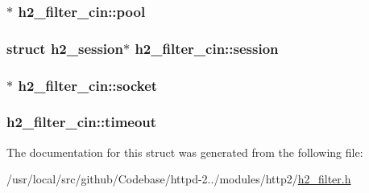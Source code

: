 \subsubsection[{\texorpdfstring{pool}{pool}}]{$\ast$ h2\+\_\+filter\+\_\+cin\+::pool}\hypertarget{structh2__filter__cin_a63b8f38ac651f0c071952a044ddca0fc}{}\label{structh2__filter__cin_a63b8f38ac651f0c071952a044ddca0fc}
\subsubsection[{\texorpdfstring{session}{session}}]{\setlength{\rightskip}{0pt plus 5cm}struct {\bf h2\+\_\+session}$\ast$ h2\+\_\+filter\+\_\+cin\+::session}\hypertarget{structh2__filter__cin_a2494031f9e3a6e0285892d2c6cebc387}{}\label{structh2__filter__cin_a2494031f9e3a6e0285892d2c6cebc387}
\subsubsection[{\texorpdfstring{socket}{socket}}]{$\ast$ h2\+\_\+filter\+\_\+cin\+::socket}\hypertarget{structh2__filter__cin_a96d37d6fd8c426538e6441eaa9b855b8}{}\label{structh2__filter__cin_a96d37d6fd8c426538e6441eaa9b855b8}
\subsubsection[{\texorpdfstring{timeout}{timeout}}]{ h2\+\_\+filter\+\_\+cin\+::timeout}\hypertarget{structh2__filter__cin_a26fc5ad8a7cb2286a085d9f8d464530c}{}\label{structh2__filter__cin_a26fc5ad8a7cb2286a085d9f8d464530c}


The documentation for this struct was generated from the following file\+:\begin{DoxyCompactItemize}
\item 
/usr/local/src/github/\+Codebase/httpd-\/2../modules/http2/\hyperlink{h2__filter_8h}{h2\+\_\+filter.\+h}\end{DoxyCompactItemize}

